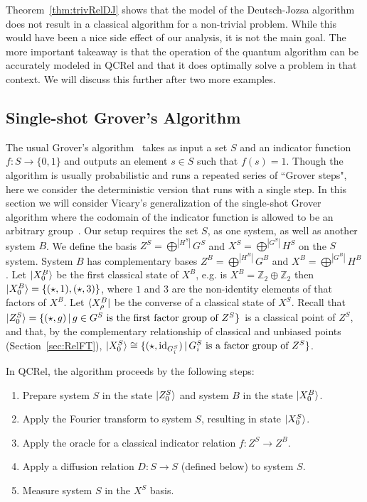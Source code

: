 Theorem~\ref{thm:trivRelDJ} shows that the model of the Deutsch-Jozsa algorithm does not result in a classical algorithm for a non-trivial problem.  While this would have been a nice side effect of our analysis, it is not the main goal. The more important takeaway is that the operation of the quantum algorithm can be accurately modeled in QCRel and that it does optimally solve a problem in that context. We will discuss this further after two more examples.

\subsection{Single-shot Grover's Algorithm}
\label{sec:qcrelgrovers}
The usual Grover's algorithm~\cite{grover1996fast} takes as input a set $S$ and an indicator function $f:S\to\{0,1\}$ and outputs an element $s\in S$ such that $f(s)=1$. Though the algorithm is usually probabilistic and runs a repeated series of ``Grover steps", here we consider the deterministic version that runs with a single step. In this section we will consider Vicary's generalization of the single-shot Grover algorithm where the codomain of the indicator function is allowed to be an arbitrary group~\cite{vicary-tqa}. Our setup requires the set $S$, as one system, as well as another system $B$. We define the basis $Z^{S}=\bigoplus^{|H^S|}G^S$ and $X^S=\bigoplus^{|G^S|}H^S$ on the $S$ system.  System $B$ has complementary bases $Z^B=\bigoplus^{|H^B|}G^B$ and $X^B=\bigoplus^{|G^B|}H^B$. Let $| X_0^B \rangle$ be the first classical state of $X^B$, e.g. is $X^B=\mathbb{Z}_2\oplus\mathbb{Z}_2$ then $| X_0^B \rangle=\{(\star,1),(\star,3)\}$, where $1$ and $3$ are the non-identity elements of that factors of $X^B$. Let $\langle X_{\rho}^B |$ be the converse of a classical state of $X^S$. Recall that $| Z^S_0 \rangle=\{(\star,g)\,|\,g\in G^S\mbox{ is the first factor group of } Z^S\}$ is a classical point of $Z^S$, and that, by the complementary relationship of classical and unbiased points (Section~\ref{sec:RelFT}), $| X^S_0 \rangle\cong\{(\star,\mbox{id}_{G^S_i})\,|\,G^S_i\mbox{ is a factor group of } Z^S\}$.

In QCRel, the algorithm proceeds by the following steps:
\begin{enumerate}
\item Prepare system $S$ in the state $| Z^S_0 \rangle$ and system $B$ in the state $| X_0^B \rangle$.

\item Apply the Fourier transform to system $S$, resulting in state $| X^{S}_0 \rangle$.

\item Apply the oracle for a classical indicator relation $f:Z^S\to Z^B$.

\item Apply a diffusion relation $D:S\to S$ (defined below) to system $S$.

\item Measure system $S$ in the $X^S$ basis.

\end{enumerate}


